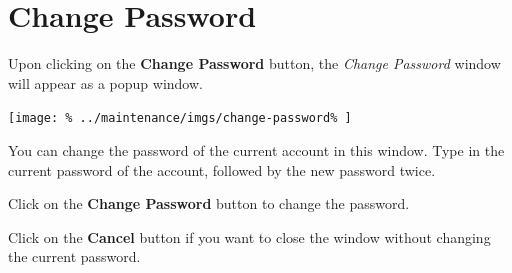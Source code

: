 \documentclass[../main/main]{subfiles}
\begin{document}
\newpage
\section{Change Password}
\label{sec:change-password}

Upon clicking on the \textbf{Change Password} button,
the \emph{Change Password} window will appear as a popup window.

\texttt{[image: \%
  ../maintenance/imgs/change-password\%
]}

You can change the password of the current account in this window. Type in the
current password of the account, followed by the new password twice.

Click on the \textbf{Change Password} button to change the password.

Click on the \textbf{Cancel} button if you want to close the window without
changing the current password.
\end{document}
